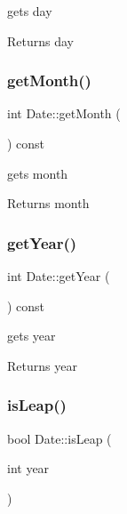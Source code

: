 gets day 

\begin{DoxyReturn}{Returns}
day 
\end{DoxyReturn}
\hypertarget{class_date_a332f6e3a2f6a40d73742b6dab7be0f64}{}\label{class_date_a332f6e3a2f6a40d73742b6dab7be0f64} 
\subsubsection{\texorpdfstring{get\+Month()}{getMonth()}}
{\footnotesize\ttfamily int Date\+::get\+Month (\begin{DoxyParamCaption}{ }\end{DoxyParamCaption}) const}



gets month 

\begin{DoxyReturn}{Returns}
month 
\end{DoxyReturn}
\hypertarget{class_date_a8b0869f34c2b38d108ab83ee2e770e5d}{}\label{class_date_a8b0869f34c2b38d108ab83ee2e770e5d} 
\subsubsection{\texorpdfstring{get\+Year()}{getYear()}}
{\footnotesize\ttfamily int Date\+::get\+Year (\begin{DoxyParamCaption}{ }\end{DoxyParamCaption}) const}



gets year 

\begin{DoxyReturn}{Returns}
year 
\end{DoxyReturn}
\hypertarget{class_date_ab068a7017e7033adba1680de395c844e}{}\label{class_date_ab068a7017e7033adba1680de395c844e} 
\subsubsection{\texorpdfstring{is\+Leap()}{isLeap()}}
{\footnotesize\ttfamily bool Date\+::is\+Leap (\begin{DoxyParamCaption}\item[{int}]{year }\end{DoxyParamCaption})}



